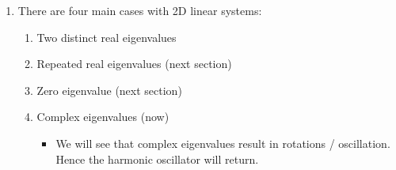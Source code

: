 \documentclass{article}
\begin{document}
\begin{enumerate}

\item There are four main cases with 2D linear systems:
\begin{enumerate}
\item Two distinct real eigenvalues
\item Repeated real eigenvalues (next section)
\item Zero eigenvalue (next section)
\item Complex eigenvalues (now)
\begin{itemize}
\item We will see that complex eigenvalues result in rotations / oscillation. Hence the harmonic oscillator will return.
\end{itemize}
\end{enumerate}


\end{enumerate}
\end{document}
